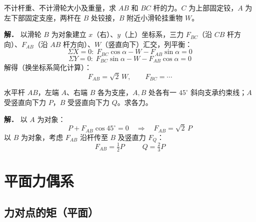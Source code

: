 \begin{example}[平衡应用例1]
不计杆重、不计滑轮大小及重量，求 $AB$ 和 $BC$ 杆的力。$C$ 为上部固定铰，$A$ 为左下部固定支座，两杆在 $B$ 处铰接，$B$ 附近小滑轮挂重物 $W$。

\textbf{解．} 以滑轮 $B$ 为对象建立 $x$（右）、$y$（上）坐标系，三力 $F_{BC}$（沿 $CB$ 杆方向）、$F_{AB}$（沿 $AB$ 杆方向）、$W$（竖直向下）汇交，列平衡：
\begin{equation}
\Sigma X=0:\;F_{BC}\cos\alpha-W-F_{AB}\sin\alpha=0
\label{eq:2-例1-平衡X}
\end{equation}
\begin{equation}
\Sigma Y=0:\;F_{BC}\sin\alpha-W-F_{AB}\cos\alpha=0
\label{eq:2-例1-平衡Y}
\end{equation}
解得（换坐标系简化计算）：
\begin{equation}
F_{AB}=\sqrt{2}\,W,\qquad F_{BC}=\cdots
\label{eq:2-例1-解}
\end{equation}
\end{example}

\begin{example}[平衡应用例2]
水平杆 $AB$，左端 $A$、右端 $B$ 各为支座，$A,B$ 处各有一 $45^\circ$ 斜向支承约束线；$A$ 受竖直向下力 $P$，$B$ 受竖直向下力 $Q$。求各力。

\textbf{解．} 以 $A$ 为对象：
\begin{equation}
P+F_{AB}\cos45^\circ=0\quad\Longrightarrow\quad F_{AB}=\sqrt{2}\,P
\label{eq:2-例2-A}
\end{equation}
以 $B$ 为对象，考虑 $F_{AB}$ 沿杆传至 $B$ 及竖直力 $F_Q$：
\begin{equation}
\boxed{\;F_{AB}=\tfrac{1}{2}P\;}\qquad\boxed{\;Q=\tfrac{2}{3}P\;}
\label{eq:2-例2-B}
\end{equation}
\end{example}
\section{平面力偶系}

\subsection{力对点的矩（平面）}

